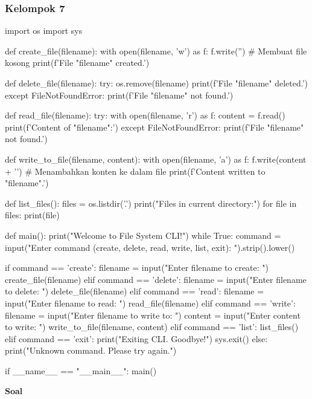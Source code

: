 \documentclass[12pt]{article}
\begin{document}
\subsubsection{Kelompok 7}
\begin{python}
import os
import sys

def create_file(filename):
    with open(filename, 'w') as f:
        f.write('')  # Membuat file kosong
    print(f'File "{filename}" created.')

def delete_file(filename):
    try:
        os.remove(filename)
        print(f'File "{filename}" deleted.')
    except FileNotFoundError:
        print(f'File "{filename}" not found.')

def read_file(filename):
    try:
        with open(filename, 'r') as f:
            content = f.read()
        print(f'Content of "{filename}":')
    except FileNotFoundError:
        print(f'File "{filename}" not found.')

def write_to_file(filename, content):
    with open(filename, 'a') as f:
        f.write(content + '\n')  # Menambahkan konten ke dalam file
    print(f'Content written to "{filename}".')

def list_files():
    files = os.listdir('.')
    print("Files in current directory:")
    for file in files:
        print(file)

def main():
    print("Welcome to File System CLI!")
    while True:
        command = input("Enter command (create, delete, read, write, list, exit): ").strip().lower()
        
        if command == 'create':
            filename = input("Enter filename to create: ")
            create_file(filename)
        elif command == 'delete':
            filename = input("Enter filename to delete: ")
            delete_file(filename)
        elif command == 'read':
            filename = input("Enter filename to read: ")
            read_file(filename)
        elif command == 'write':
            filename = input("Enter filename to write to: ")
            content = input("Enter content to write: ")
            write_to_file(filename, content)
        elif command == 'list':
            list_files()
        elif command == 'exit':
            print("Exiting CLI. Goodbye!")
            sys.exit()
        else:
            print("Unknown command. Please try again.")

if __name__ == "__main__":
    main()
\end{python}

\textbf{Soal}
\end{document}
